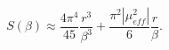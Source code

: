 \begin{equation}
S\left(\beta \right)\approx \frac{4\pi ^{4}}{45}\frac{r^{3}}{\beta ^{3}}+\frac{\pi ^{2}\left|\mu _{eff}^{2}\right|}{6}\frac{r}{\beta }.\end{equation}

